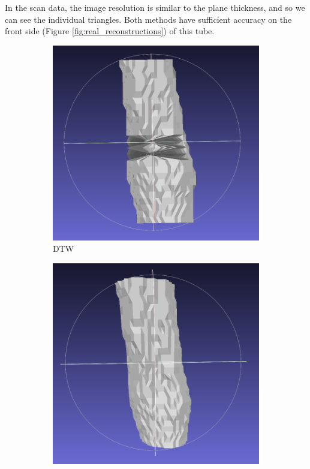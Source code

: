\documentclass[11p, titlepage]{article}
\begin{document}
In the scan data, the image resolution is similar to the plane thickness, and so we can see the individual triangles. Both methods have sufficient accuracy on the front side (Figure \ref{fig:real_reconstructions}) of this tube.

\begin{figure}[h!]
     \centering
     \begin{subfigure}[b]{0.45\textwidth}
         \centering
         \includegraphics[width=\textwidth]{reconstructions/dtw-real-back}
         \caption{DTW}
         \label{fig:dtw_real_back}
     \end{subfigure}
     \hfill
     \begin{subfigure}[b]{0.45\textwidth}
         \centering
         \includegraphics[width=\textwidth]{reconstructions/cspa50-real-back}

\end{subfigure}
\end{figure}
\end{document}
